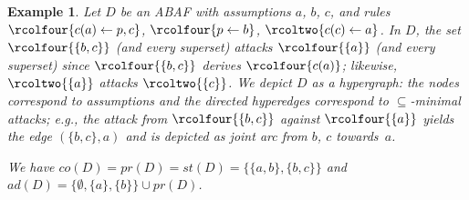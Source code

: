 \documentclass[letterpaper]{article} %
\newcommand{\adm}{\textit{ad}}
\newcommand{\com}{\textit{co}}
\newcommand{\stb}{\textit{st}}
\newcommand{\prf}{\textit{pr}}
\newcommand{\asms}{\asm}
\newcommand{\lit}{\ensuremath{\mathcal{L}}}
\newcommand{\rules}{\ensuremath{\mathcal{R}}}
\newcommand{\asm}{\ensuremath{\mathcal{A}}}
\newcommand{\atoms}{\mathcal{L}}
\newcommand{\ruleset}{\mathcal{R}}
\newcommand{\assumptions}{\mathcal{A}}
\newcommand{\contra}{c}
\newcommand{\contrary}[1]{c(#1)}
\newcommand{\ABAdef}{D=(\atoms,\ruleset,\assumptions,\contra)}
\newtheorem{example}{Example}[section]
\begin{document}
\begin{example}\label{ex:background}
Let
$D$ be an ABAF with assumptions $a$, $b$, $c$,
and rules $\rcolfour{\contrary{a}\gets p,c}$, $\rcolfour{p \gets b}$, $\rcoltwo{\contrary{c}\gets a}$. 
In $D$, the set $\rcolfour{\{b,c\}}$ (and every superset) attacks $\rcolfour{\{a\}}$ (and every superset) since $\rcolfour{\{b,c\}}$ derives $\rcolfour{\contrary{a}}$; likewise, 
$\rcoltwo{\{a\}}$ attacks $\rcoltwo{\{c\}}$. 
%
We depict $D$ as a hypergraph: 
 the nodes correspond to assumptions and the directed hyperedges correspond to $\subseteq$-minimal attacks; e.g., the attack from $\rcolfour{\{b,c\}}$ against $\rcolfour{\{a\}}$ yields the edge $(\{b,c\},a)$ and is depicted as joint arc from $b$, $c$ towards~$a$.
\begin{center}
\end{center}
\noindent
We have $\com(D)\!=\!\prf(D)\!=\!\stb(D)\!=\!\{\{a,b\},\{b,c\}\}$ and $\adm(D)\!=\!\{\emptyset,\{a\},\{b\}\}\cup \prf(D)$.%
\end{example}
\newcommand{\Skept}{\mathit{Skept}}
\newcommand{\Cred}{\mathit{Cred}}
\newcommand{\Ver}{\mathit{Ver}}



\end{document}
